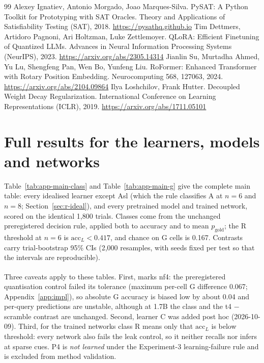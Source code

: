 \documentclass[11pt]{article}
\begin{document}
\begin{thebibliography}{99}
 Alexey Ignatiev, Antonio Morgado, Joao Marques-Silva. \newblock PySAT: A Python Toolkit for Prototyping with SAT Oracles. \newblock Theory and Applications of Satisfiability Testing (SAT), 2018. \newblock \url{https://pysathq.github.io}
 Tim Dettmers, Artidoro Pagnoni, Ari Holtzman, Luke Zettlemoyer. \newblock QLoRA: Efficient Finetuning of Quantized LLMs. \newblock Advances in Neural Information Processing Systems (NeurIPS), 2023. \newblock \url{https://arxiv.org/abs/2305.14314}
 Jianlin Su, Murtadha Ahmed, Yu Lu, Shengfeng Pan, Wen Bo, Yunfeng Liu. \newblock RoFormer: Enhanced Transformer with Rotary Position Embedding. \newblock Neurocomputing 568, 127063, 2024. \newblock \url{https://arxiv.org/abs/2104.09864}
 Ilya Loshchilov, Frank Hutter. \newblock Decoupled Weight Decay Regularization. \newblock International Conference on Learning Representations (ICLR), 2019. \newblock \url{https://arxiv.org/abs/1711.05101}
\end{thebibliography}
\clearpage
\appendix

\section{Full results for the learners, models and networks}\label{app:main}

Table~\ref{tab:app-main-class} and Table~\ref{tab:app-main-g} give the complete main table: every idealised learner except Asl (which the rule classifies A at $n = 6$ and $n = 8$; Section~\ref{sec:r-ideal}), and every pretrained model and trained network, scored on the identical 1,800 trials. Classes come from the unchanged preregistered decision rule, applied both to accuracy and to mean $p_{\mathrm{gold}}$; the R threshold at $n = 6$ is $\mathrm{acc}_L < 0.417$, and chance on G cells is 0.167. Contrasts carry trial-bootstrap 95\% CIs (2,000 resamples, with seeds fixed per test so that the intervals are reproducible).

Three caveats apply to these tables. First, \textsuperscript{\dag} marks nf4: the preregistered quantisation control failed its tolerance (maximum per-cell G difference 0.067; Appendix~\ref{app:impl}), so absolute G accuracy is biased low by about 0.04 and per-query predictions are unstable, although at 1.7B the class and the t4 $-$ scramble contrast are unchanged. Second, learner C was added post hoc (2026-10-09). Third, for the trained networks class R means only that $\mathrm{acc}_L$ is below threshold: every network also fails the leak control, so it neither recalls nor infers at sparse cues. P4 is \emph{not learned} under the Experiment-3 learning-failure rule and is excluded from method validation.
\end{document}
